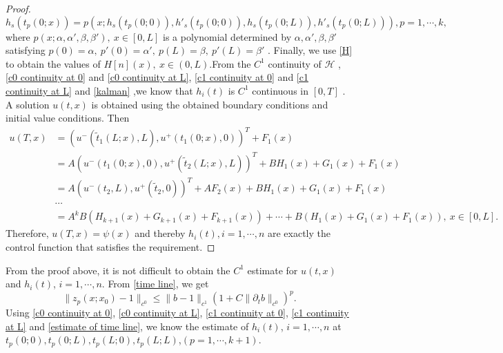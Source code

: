 \documentclass[a4paper,reqno,11pt]{amsart}
\numberwithin{equation}{section} %
\begin{document}
\begin{proof}
\begin{equation}\label{polynomial p s}
	h_s\left( t_p\left( 0;x \right) \right) =p\left( x;h_s\left( t_p\left( 0;0 \right) \right) ,h'_s\left( t_p\left( 0;0 \right) \right) ,h_s\left( t_p\left( 0;L \right) \right) ,h'_s\left( t_p\left( 0;L \right) \right) \right) ,p=1,\cdots,k,
\end{equation}
where $p(x;\alpha ,\alpha  ',\beta ,\beta  ') ,\ x \in [0,L]$ is a polynomial determined by $\alpha ,\alpha  ',\beta ,\beta  '$ satisfying $p(0)=\alpha ,\ p'(0)=\alpha  ',\ p(L)=\beta ,\ p'(L)=\beta  '$ . Finally, we use \eqref{H} to obtain the values of $H\left[ n \right] \left( x \right),\  x \in (0,L)$.From the $C^1$ continuity of $\mathcal{H}$ , \eqref{c0 continuity at 0} and \eqref{c0 continuity at L}, \eqref{c1 continuity at 0} and \eqref{c1 continuity at L} and \eqref{kalman} ,we know that $h_i(t)$ is $C^1$ continuous in $[0,T]$ .
A solution $u(t,x)$ is obtained using the obtained boundary conditions and initial value conditions. Then
\begin{equation}
	\begin{aligned}
		u(T,x)				   &=(u^- (\tilde{t} _1(L;x) ,L) ,u^+ (t _1(0;x),0))^T + F_1(x)\\
							   &=A(u^- (t _1(0;x) ,0) ,u^+ (\tilde{t} _2 (L;x),L))^T + BH_1(x)+G_1(x)+F_1(x)\\
							   &=A(u^- (t _2 ,L) ,u^+ (\tilde{t} _2 ,0))^T +AF_2(x)+ BH_1(x)+G_1(x)+F_1(x)\\
							   & \cdots \\
							   &=A^kB(H_{k+1}\left( x \right)+G_{k+1}\left( x \right)+F_{k+1}\left( x \right)) +\cdots  +B(H_1\left( x \right)+G_1\left( x \right)+F_1\left( x \right)) ,\ x\in \left[ 0,L \right].
	\end{aligned}
\end{equation}
Therefore, $u(T,x)=\psi(x)$ and thereby $h_i(t),i=1,\cdots,n$ are exactly the control function that satisfies the requirement.
\end{proof}
From the proof above, it is not difficult to obtain the $C^1$ estimate for $u(t,x)$ and $h_i(t)$, $i=1,\cdots,n$.
From \eqref{time line}, we get
\begin{equation}\label{estimate of time line}
	\lVert z_p\left( x;x_0 \right) -1 \rVert _{c^0}\leq \lVert b-1 \rVert _{c^1}\left( 1+C\lVert \partial _tb \rVert _{c^0} \right) ^p .
\end{equation}
Using \eqref{c0 continuity at 0}, \eqref{c0 continuity at L}, \eqref{c1 continuity at 0}, \eqref{c1 continuity at L} and \eqref{estimate of time line}, we know the estimate of $h_i(t)$, $i=1,\cdots,n$ at $t_p(0;0),t_p(0;L),t_p(L;0),t_p(L;L)$,$(p=1,\cdots,k+1)$.
\end{document}
